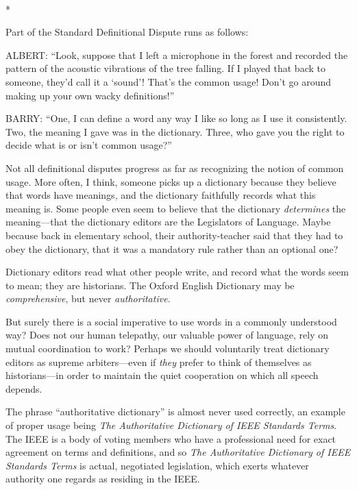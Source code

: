 {\centering
 \ ~
\par}

{\centering
 *
\par}


{
 Part of the Standard Definitional Dispute runs as follows:}

{
 ALBERT: ``Look, suppose that I left a microphone
in the forest and recorded the pattern of the acoustic vibrations of
the tree falling. If I played that back to someone,
they'd call it a
`sound'! That's the
common usage! Don't go around making up your own wacky
definitions!''}

{
 BARRY: ``One, I can define a word any way I like
so long as I use it consistently. Two, the meaning I gave was in the
dictionary. Three, who gave you the right to decide what is or
isn't common usage?''}

{
 Not all definitional disputes progress as far as recognizing the
notion of common usage. More often, I think, someone picks up a
dictionary because they believe that words have meanings, and the
dictionary faithfully records what this meaning is. Some people even
seem to believe that the dictionary \textit{determines} the
meaning---that the dictionary editors are the Legislators of Language.
Maybe because back in elementary school, their authority-teacher said
that they had to obey the dictionary, that it was a mandatory rule
rather than an optional one?}

{
 Dictionary editors read what other people write, and record what
the words seem to mean; they are historians. The Oxford English
Dictionary may be \textit{comprehensive}, but never
\textit{authoritative.}}

{
 But surely there is a social imperative to use words in a commonly
understood way? Does not our human telepathy, our valuable power of
language, rely on mutual coordination to work? Perhaps we should
voluntarily treat dictionary editors as supreme arbiters---even if
\textit{they} prefer to think of themselves as historians---in order to
maintain the quiet cooperation on which all speech depends.}

{
 The phrase ``authoritative
dictionary'' is almost never used correctly, an
example of proper usage being \textit{The Authoritative Dictionary of
IEEE Standards Terms}. The IEEE is a body of voting members who have a
professional need for exact agreement on terms and definitions, and so
\textit{The Authoritative Dictionary of IEEE Standards Terms} is
actual, negotiated legislation, which exerts whatever authority one
regards as residing in the IEEE.}

